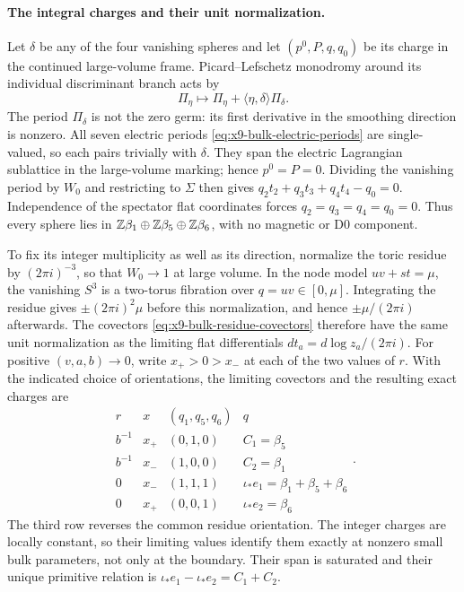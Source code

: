 \paragraph{The integral charges and their unit normalization.}
Let $\delta$ be any of the four vanishing spheres and let
$(p^0,P,q,q_0)$ be its charge in the continued large-volume frame.
Picard--Lefschetz monodromy around its individual discriminant
branch acts by
\begin{equation}
 \Pi_\eta\longmapsto\Pi_\eta+
       \langle\eta,\delta\rangle\Pi_\delta.
 \label{eq:x9-bulk-electric-invariance}
\end{equation}
The period $\Pi_\delta$ is not the zero germ: its first derivative
in the smoothing direction is nonzero. All seven electric periods
\eqref{eq:x9-bulk-electric-periods} are single-valued, so each
pairs trivially with $\delta$. They span the electric Lagrangian
sublattice in the large-volume marking; hence $p^0=P=0$.
Dividing the vanishing period by $W_0$ and restricting to $\Sigma$
then gives
$q_2t_2+q_3t_3+q_4t_4-q_0=0$.
Independence of the spectator flat coordinates forces
$q_2=q_3=q_4=q_0=0$. Thus every sphere lies in
$\mathbb Z\beta_1\oplus\mathbb Z\beta_5\oplus\mathbb Z\beta_6$, with no magnetic
or D0 component.

To fix its integer multiplicity as well as its direction, normalize
the toric residue by $(2\pi i)^{-3}$, so that $W_0\to1$ at
large volume. In the node model $uv+st=\mu$, the vanishing
$S^3$ is a two-torus fibration over $q=uv\in[0,\mu]$.
Integrating the residue gives $\pm(2\pi i)^2\mu$ before this
normalization, and hence $\pm\mu/(2\pi i)$ afterwards. The
covectors \eqref{eq:x9-bulk-residue-covectors} therefore have the
same unit normalization as the limiting flat differentials
$dt_a=d\log z_a/(2\pi i)$.
For positive $(v,a,b)\to0$, write $x_+>0>x_-$ at each of the
two values of $r$. With the indicated choice of orientations,
the limiting covectors and the resulting exact charges are
\begin{equation}
 \begin{array}{c|c|c|c}
 r&x& (q_1,q_5,q_6)&q\\\hline
 b^{-1}&x_+&(0,1,0)&C_1=\beta_5\\
 b^{-1}&x_-&(1,0,0)&C_2=\beta_1\\
 0&x_-&(1,1,1)&\iota_*e_1=\beta_1+\beta_5+\beta_6\\
 0&x_+&(0,0,1)&\iota_*e_2=\beta_6
 \end{array}.
 \label{eq:x9-bulk-unit-charge-marking}
\end{equation}
The third row reverses the common residue orientation. The
integer charges are locally constant, so their limiting values
identify them exactly at nonzero small bulk parameters, not only
at the boundary. Their span is saturated and their unique
primitive relation is $\iota_*e_1-\iota_*e_2=C_1+C_2$.

